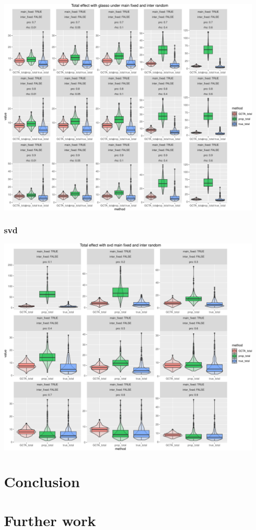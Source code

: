 \documentclass[]{article}
\begin{document}
\includegraphics{Simulation_report_glasso_files/figure-latex/fixed random total glasso-3.pdf}

\subsubsection{svd}\label{svd-1}

\includegraphics{Simulation_report_glasso_files/figure-latex/fixed random total svd-1.pdf}

\section{Conclusion}\label{conclusion}

\section{Further work}\label{further-work}
\end{document}
